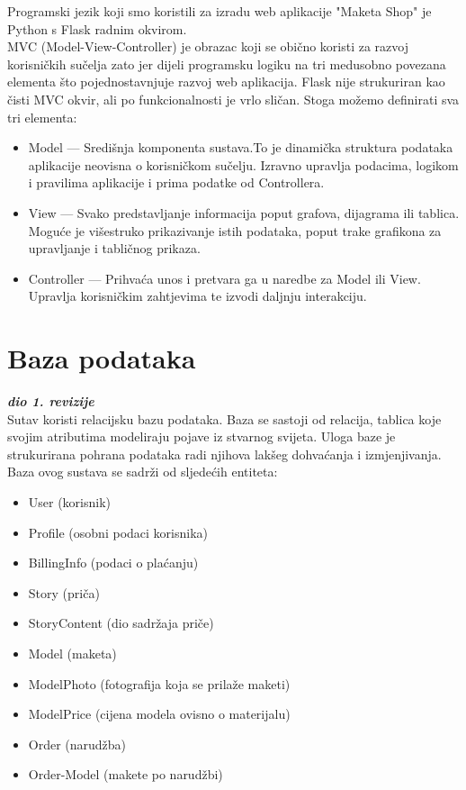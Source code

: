 		Programski jezik koji smo koristili za izradu web aplikacije "Maketa Shop" je Python s Flask radnim okvirom.\\
		
		MVC (Model-View-Controller) je obrazac koji se obično koristi za razvoj korisničkih sučelja zato jer dijeli programsku	logiku na tri medusobno povezana elementa što pojednostavnjuje razvoj web	aplikacija. Flask nije strukuriran kao čisti MVC okvir, ali po funkcionalnosti je vrlo sličan. Stoga možemo definirati sva tri elementa: 
		\begin{itemize}
			\item Model --- Središnja komponenta sustava.To je dinamička struktura podataka aplikacije neovisna o korisničkom sučelju. Izravno upravlja podacima, logikom i pravilima aplikacije i prima podatke od Controllera.
			\item View --- Svako predstavljanje informacija poput grafova, dijagrama ili tablica. Moguće je višestruko prikazivanje istih podataka, poput trake grafikona za upravljanje i tabličnog prikaza.
			\item Controller --- Prihvaća unos i pretvara ga u naredbe za Model ili View. Upravlja	korisničkim zahtjevima te izvodi daljnju interakciju.
		\end{itemize}
				
		\section{Baza podataka}
			
			\textbf{\textit{dio 1. revizije}}\\
			
			\noindent Sutav koristi relacijsku bazu podataka. Baza se sastoji od relacija, tablica koje svojim atributima modeliraju pojave iz stvarnog svijeta. Uloga baze je strukurirana pohrana  podataka radi njihova lakšeg dohvaćanja i izmjenjivanja. Baza ovog sustava se sadrži od sljedećih entiteta:
			\begin{itemize}
				\item User (korisnik)
				\item Profile (osobni podaci korisnika)
				\item BillingInfo (podaci o plaćanju)
				\item Story (priča)
				\item StoryContent (dio sadržaja priče) 
				\item Model (maketa)
				\item ModelPhoto (fotografija koja se prilaže maketi)
				\item ModelPrice (cijena modela ovisno o materijalu)
				\item Order (narudžba)
				\item Order-Model (makete po narudžbi)
			\end{itemize}
		
